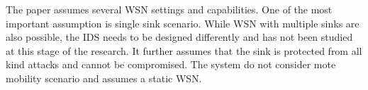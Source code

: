 \documentclass[conference]{IEEEtran}
\begin{document}


The paper assumes several WSN settings and capabilities.
One of the most important assumption is single  sink scenario. While WSN with multiple sinks are also possible, the IDS needs to be designed differently and has not been studied at this stage of the research. 
It further assumes that the sink is protected from all kind attacks and cannot be compromised. 
The system do not consider mote mobility scenario and assumes a static WSN.


\end{document}
